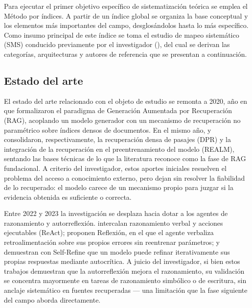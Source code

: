 
Para ejecutar el primer objetivo específico de sistematización teórica se emplea el Método por índices. A partir de un índice global se organiza la base conceptual y los elementos más importantes del campo, desglosándolos hasta lo más específico. Como insumo principal de este índice se toma el estudio de mapeo sistemático (SMS) conducido previamente por el investigador (\cite{Alcides2026}), del cual se derivan las categorías, arquitecturas y autores de referencia que se presentan a continuación.

\subsection{Estado del arte}

El estado del arte relacionado con el objeto de estudio se remonta a 2020, año en que \textcite{Lewis2020rag} formalizaron el paradigma de Generación Aumentada por Recuperación (RAG), acoplando un modelo generador con un mecanismo de recuperación no paramétrico sobre índices densos de documentos. En el mismo año, \textcite{Karpukhin2020_DPR} y \textcite{Guu2020_REALM} consolidaron, respectivamente, la recuperación densa de pasajes (DPR) y la integración de la recuperación en el preentrenamiento del modelo (REALM), sentando las bases técnicas de lo que la literatura reconoce como la fase de RAG fundacional. A criterio del investigador, estos aportes iniciales resuelven el problema del acceso a conocimiento externo, pero dejan sin resolver la fiabilidad de lo recuperado: el modelo carece de un mecanismo propio para juzgar si la evidencia obtenida es suficiente o correcta.

Entre 2022 y 2023 la investigación se desplaza hacia dotar a los agentes de razonamiento y autorreflexión. \textcite{Yao2022_ReAct} intercalan razonamiento verbal y acciones ejecutables (ReAct); \textcite{Shinn2023_Reflexion} proponen Reflexión, en el que el agente verbaliza retroalimentación sobre sus propios errores sin reentrenar parámetros; y \textcite{Madaan2024_SelfRefine} demuestran con Self-Refine que un modelo puede refinar iterativamente sus propias respuestas mediante autocrítica. A juicio del investigador, si bien estos trabajos demuestran que la autorreflexión mejora el razonamiento, su validación se concentra mayormente en tareas de razonamiento simbólico o de escritura, sin anclaje sistemático en fuentes recuperadas --- una limitación que la fase siguiente del campo aborda directamente.

